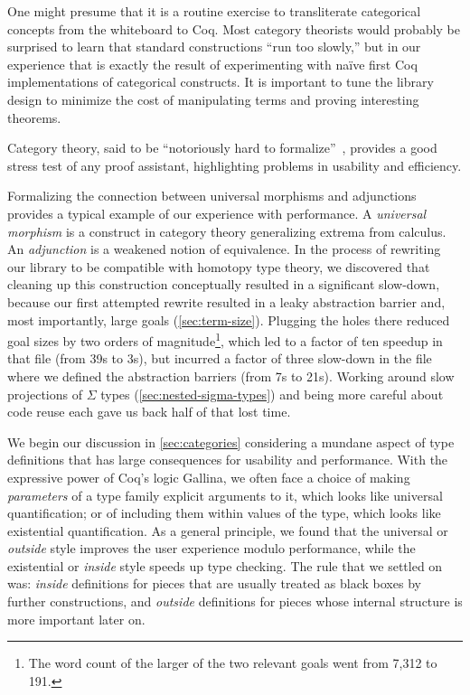 One might presume that it is a routine exercise to transliterate categorical concepts from the whiteboard to Coq.
Most category theorists would probably be surprised to learn that standard constructions ``run too slowly,'' but in our experience that is exactly the result of experimenting with na\"ive first Coq implementations of categorical constructs.
It is important to tune the library design to minimize the cost of manipulating terms and proving interesting theorems.

Category theory, said to be ``notoriously hard to formalize''~\cite{harrison1996formalized}, provides a good stress test of any proof assistant, highlighting problems in usability and efficiency.

Formalizing the connection between universal morphisms and adjunctions provides a typical example of our experience with performance.
A \emph{universal morphism} is a construct in category theory generalizing extrema from calculus.
An \emph{adjunction} is a weakened notion of equivalence.
In the process of rewriting our library to be compatible with homotopy type theory, we discovered that cleaning up this construction conceptually resulted in a significant slow-down, because our first attempted rewrite resulted in a leaky abstraction barrier and, most importantly, large goals (\autoref{sec:term-size}).
Plugging the holes there reduced goal sizes by two orders of magnitude\footnote{The word count of the larger of the two relevant goals went from 7,312 to 191.}, which led to a factor of ten speedup in that file (from 39s to 3s), but incurred a factor of three slow-down in the file where we defined the abstraction barriers (from 7s to 21s).
Working around slow projections of $\Sigma$ types (\autoref{sec:nested-sigma-types}) and being more careful about code reuse each gave us back half of that lost time.

\medskip

We begin our discussion in \autoref{sec:categories} considering a mundane aspect of type definitions that has large consequences for usability and performance.
With the expressive power of Coq's logic Gallina, we often face a choice of making \emph{parameters} of a type family explicit arguments to it, which looks like universal quantification; or of including them within values of the type, which looks like existential quantification.
As a general principle, we found that the universal or \emph{outside} style improves the user experience modulo performance, while the existential or \emph{inside} style speeds up type checking.
The rule that we settled on was: \emph{inside} definitions for pieces that are usually treated as black boxes by further constructions, and \emph{outside} definitions for pieces whose internal structure is more important later on.

